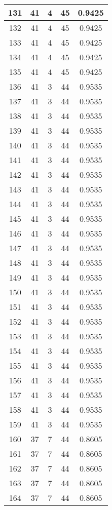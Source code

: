 \documentclass[letterpaper, 12pt]{article}
\begin{document}
\begin{longtable}{|c|c|c|c|c|}
\hline
131 & 41 & 4 & 45 & 0.9425 \\
\hline
132 & 41 & 4 & 45 & 0.9425 \\
\hline
133 & 41 & 4 & 45 & 0.9425 \\
\hline
134 & 41 & 4 & 45 & 0.9425 \\
\hline
135 & 41 & 4 & 45 & 0.9425 \\
\hline
136 & 41 & 3 & 44 & 0.9535 \\
\hline
137 & 41 & 3 & 44 & 0.9535 \\
\hline
138 & 41 & 3 & 44 & 0.9535 \\
\hline
139 & 41 & 3 & 44 & 0.9535 \\
\hline
140 & 41 & 3 & 44 & 0.9535 \\
\hline
141 & 41 & 3 & 44 & 0.9535 \\
\hline
142 & 41 & 3 & 44 & 0.9535 \\
\hline
143 & 41 & 3 & 44 & 0.9535 \\
\hline
144 & 41 & 3 & 44 & 0.9535 \\
\hline
145 & 41 & 3 & 44 & 0.9535 \\
\hline
146 & 41 & 3 & 44 & 0.9535 \\
\hline
147 & 41 & 3 & 44 & 0.9535 \\
\hline
148 & 41 & 3 & 44 & 0.9535 \\
\hline
149 & 41 & 3 & 44 & 0.9535 \\
\hline
150 & 41 & 3 & 44 & 0.9535 \\
\hline
151 & 41 & 3 & 44 & 0.9535 \\
\hline
152 & 41 & 3 & 44 & 0.9535 \\
\hline
153 & 41 & 3 & 44 & 0.9535 \\
\hline
154 & 41 & 3 & 44 & 0.9535 \\
\hline
155 & 41 & 3 & 44 & 0.9535 \\
\hline
156 & 41 & 3 & 44 & 0.9535 \\
\hline
157 & 41 & 3 & 44 & 0.9535 \\
\hline
158 & 41 & 3 & 44 & 0.9535 \\
\hline
159 & 41 & 3 & 44 & 0.9535 \\
\hline
160 & 37 & 7 & 44 & 0.8605 \\
\hline
161 & 37 & 7 & 44 & 0.8605 \\
\hline
162 & 37 & 7 & 44 & 0.8605 \\
\hline
163 & 37 & 7 & 44 & 0.8605 \\
\hline
164 & 37 & 7 & 44 & 0.8605 \\

\end{longtable}
\end{document}
